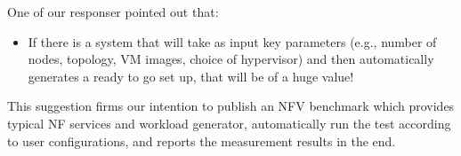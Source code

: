 One of our responser pointed out that:
\begin{itemize}
\item[]{}
If there is a system that will take as input key parameters (e.g., number of nodes, topology, VM images, choice of hypervisor) and then automatically generates a ready to go set up, that will be of a huge value!
\end{itemize}
This suggestion firms our intention to publish an NFV benchmark
which provides typical NF services and workload generator,
automatically run the test according to user configurations,
and  reports the measurement results in the end.


